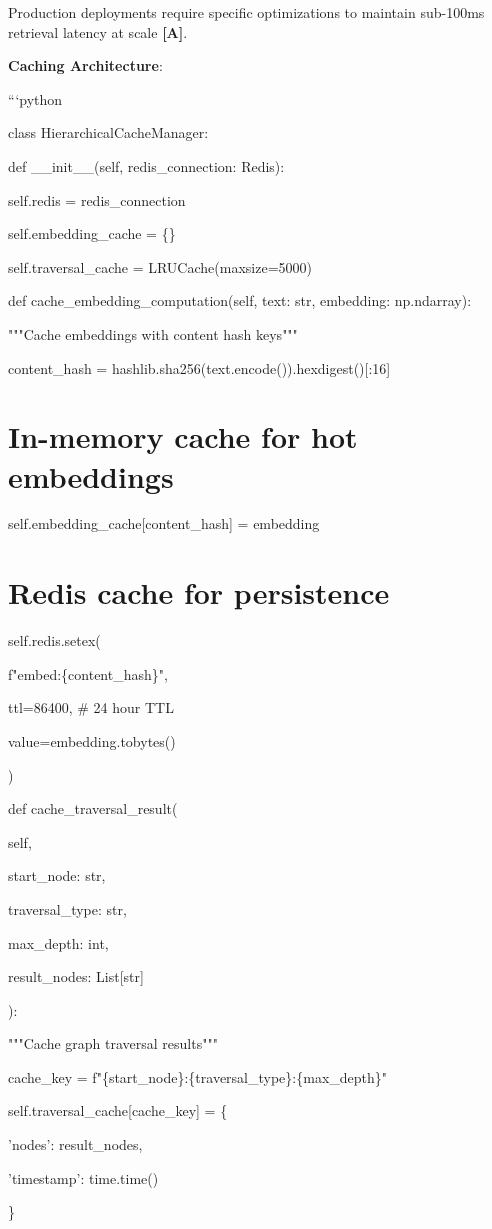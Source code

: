 \documentclass[a4paper,11pt]{article}
\newcommand{\alabel}{\textbf{\textcolor{acolor}{[A]}}}
\begin{document}
Production deployments require specific optimizations to maintain sub-100ms retrieval latency at scale \alabel{}.


\textbf{Caching Architecture}:

```python

class HierarchicalCacheManager:

def \_\_init\_\_(self, redis\_connection: Redis):

self.redis = redis\_connection

self.embedding\_cache = \{\}

self.traversal\_cache = LRUCache(maxsize=5000)


def cache\_embedding\_computation(self, text: str, embedding: np.ndarray):

"""Cache embeddings with content hash keys"""

content\_hash = hashlib.sha256(text.encode()).hexdigest()[:16]


\section{In-memory cache for hot embeddings}
self.embedding\_cache[content\_hash] = embedding


\section{Redis cache for persistence}
self.redis.setex(

f"embed:\{content\_hash\}",

ttl=86400,  \# 24 hour TTL

value=embedding.tobytes()

)


def cache\_traversal\_result(

self,

start\_node: str,

traversal\_type: str,

max\_depth: int,

result\_nodes: List[str]

):

"""Cache graph traversal results"""

cache\_key = f"\{start\_node\}:\{traversal\_type\}:\{max\_depth\}"


self.traversal\_cache[cache\_key] = \{

'nodes': result\_nodes,

'timestamp': time.time()

\}
\end{document}
